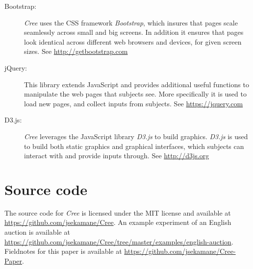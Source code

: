 \documentclass[preprint, 12pt]{elsarticle}
\newcommand{\Cree}{\emph{Cree}\xspace}
\begin{document}
\begin{description}
  \item[Bootstrap:] \Cree uses the CSS framework \emph{Bootstrap}, which insures that pages scale seamlessly across small and big screens. In addition it ensures that pages look identical across different web browsers and devices, for given screen sizes. See \url{http://getbootstrap.com}
  \item[jQuery:] This library extends JavaScript and provides additional useful functions to manipulate the web pages that subjects see. More specifically it is used to load new pages, and collect inputs from subjects. See \url{https://jquery.com}
  \item[D3.js:] \Cree leverages the JavaScript library \emph{D3.js} to build graphics. \emph{D3.js} is used to build both static graphics and graphical interfaces, which subjects can interact with and provide inputs through. See \url{http://d3js.org}
\end{description}

\section{Source code}

The source code for \Cree is licensed under the MIT license and available at \url{https://github.com/jsekamane/Cree}. An example experiment of an English auction is available at \url{https://github.com/jsekamane/Cree/tree/master/examples/english-auction}. Fieldnotes for this paper is available at \url{https://github.com/jsekamane/Cree-Paper}.

\newpage


\raggedright
\singlespacing

\end{document}
